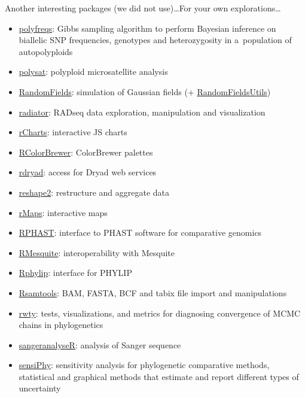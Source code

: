 \documentclass[compress, ucs, xelatex, 11pt, xcolor=svgnames, aspectratio=169,
	hyperref={
		bookmarks=true,
		unicode=true,
		colorlinks=true,
		pdftitle={Molecular data in R},
		plainpages=false,
		pdfauthor={Vojtech Zeisek},
		pdfsubject={Course about phylogeny and evolution in R},
		pdfcreator={XeLaTeX},
		pdfkeywords={R, evolution, phylogeny, molecular data},
		linkcolor=Crimson, %
		anchorcolor=Magenta, %
		citecolor=Magenta, %
		filecolor=Magenta, %
		menucolor=Magenta, %
		urlcolor=DodgerBlue, %
		pdftex},
	url={hyphens, lowtilde} %
	]{beamer}
\begin{document}
\begin{frame}[allowframebreaks]{Another interesting packages (we did not use)\ldots}{For your own explorations\ldots}
\begin{itemize}
		\item \href{https://CRAN.R-project.org/package=polyfreqs}{polyfreqs}: Gibbs sampling algorithm to perform Bayesian inference on biallelic SNP frequencies, genotypes and heterozygosity in a~population of autopolyploids
		\item \href{https://CRAN.R-project.org/package=polysat}{polysat}: polyploid microsatellite analysis
		\item \href{https://CRAN.R-project.org/package=RandomFields}{RandomFields}: simulation of Gaussian fields (+ \href{https://CRAN.R-project.org/package=RandomFieldsUtils}{RandomFieldsUtils})
		\item \href{https://github.com/thierrygosselin/radiator}{radiator}: RADseq data exploration, manipulation and visualization
		\item \href{https://github.com/ramnathv/rCharts}{rCharts}: interactive JS charts
		\item \href{https://CRAN.R-project.org/package=RColorBrewer}{RColorBrewer}: ColorBrewer palettes
		\item \href{https://CRAN.R-project.org/package=rdryad}{rdryad}: access for Dryad web services
		\item \href{https://CRAN.R-project.org/package=reshape2}{reshape2}: restructure and aggregate data
		\item \href{https://github.com/ramnathv/rMaps}{rMaps}: interactive maps
		\item \href{https://github.com/CshlSiepelLab/RPHAST}{RPHAST}: interface to PHAST software for comparative genomics
		\item \href{https://r-forge.r-project.org/projects/rmesquite/}{RMesquite}: interoperability with Mesquite
		\item \href{https://CRAN.R-project.org/package=Rphylip}{Rphylip}: interface for PHYLIP
		\item \href{https://bioconductor.org/packages/release/bioc/html/Rsamtools.html}{Rsamtools}: BAM, FASTA, BCF and tabix file import and manipulations
		\item \href{https://CRAN.R-project.org/package=rwty}{rwty}: tests, visualizations, and metrics for diagnosing convergence of MCMC chains in phylogenetics
		\item \href{https://bioconductor.org/packages/release/bioc/html/sangeranalyseR.html}{sangeranalyseR}: analysis of Sanger sequence
		\item \href{https://CRAN.R-project.org/package=sensiPhy}{sensiPhy}: sensitivity analysis for phylogenetic comparative methods,  statistical and graphical methods that estimate and report different types of uncertainty

\end{itemize}
\end{frame}
\end{document}
